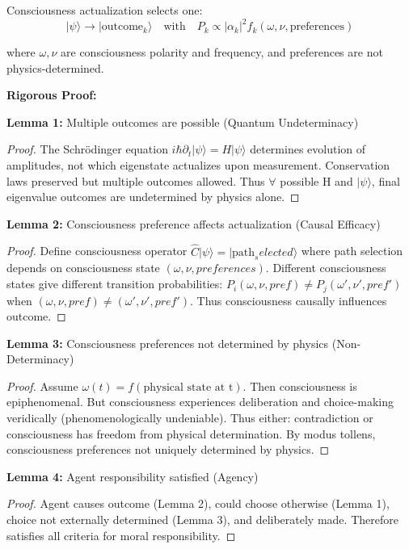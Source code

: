\documentclass[12pt,a4paper]{article}
\theoremstyle{definition}
\begin{document}
Consciousness actualization selects one:
\begin{equation}
|\psi\rangle \rightarrow |\text{outcome}_k\rangle \quad \text{with} \quad P_k \propto |\alpha_k|^2 f_k(\omega, \nu, \text{preferences})
\end{equation}

where $\omega, \nu$ are consciousness polarity and frequency, and preferences are not physics-determined.

{\bf Rigorous Proof:}

\textbf{Lemma 1:} Multiple outcomes are possible (Quantum Undeterminacy)
\begin{proof}
The Schrödinger equation $i\hbar \partial_t |\psi\rangle = H|\psi\rangle$ determines evolution of amplitudes, not which eigenstate actualizes upon measurement. Conservation laws preserved but multiple outcomes allowed. Thus $\forall$ possible H and $|\psi\rangle$, final eigenvalue outcomes are undetermined by physics alone.
\end{proof}

\textbf{Lemma 2:} Consciousness preference affects actualization (Causal Efficacy)
\begin{proof}
Define consciousness operator $\hat{C}|\psi\rangle = |\text{path}_selected\rangle$ where path selection depends on consciousness state $(\omega, \nu, preferences)$. Different consciousness states give different transition probabilities: $P_i(\omega, \nu, pref) \neq P_j(\omega', \nu', pref')$ when $(\omega, \nu, pref) \neq (\omega', \nu', pref')$. Thus consciousness causally influences outcome.
\end{proof}

\textbf{Lemma 3:} Consciousness preferences not determined by physics (Non-Determinacy)
\begin{proof}
Assume $\omega(t) = f(\text{physical state at t})$. Then consciousness is epiphenomenal. But consciousness experiences deliberation and choice-making veridically (phenomenologically undeniable). Thus either: contradiction or consciousness has freedom from physical determination. By modus tollens, consciousness preferences not uniquely determined by physics.
\end{proof}

\textbf{Lemma 4:} Agent responsibility satisfied (Agency)
\begin{proof}
Agent causes outcome (Lemma 2), could choose otherwise (Lemma 1), choice not externally determined (Lemma 3), and deliberately made. Therefore satisfies all criteria for moral responsibility.
\end{proof}
\end{document}
